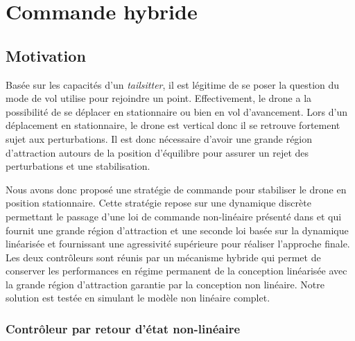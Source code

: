 
\chapter{Commande hybride}
\minitoc


\section{Motivation}
Basée sur les capacités d'un \textit{tailsitter}, il est légitime de se poser la question du mode de vol utilise pour rejoindre un point. Effectivement, le drone a la possibilité de se déplacer en stationnaire ou bien en vol d'avancement. Lors d'un déplacement en stationnaire, le drone est vertical donc il se retrouve fortement sujet aux perturbations. Il est donc nécessaire d'avoir une grande région d'attraction autours de la position d'équilibre pour assurer un rejet des perturbations et une stabilisation.

Nous avons donc proposé une stratégie de commande pour stabiliser le drone en position stationnaire. Cette stratégie repose sur une dynamique discrète permettant le passage d'une loi de commande non-linéaire présenté dans \cite{2020e-MicCenZacFra} et qui fournit une grande région d'attraction et une seconde loi basée sur la dynamique linéarisée et fournissant une agressivité supérieure pour réaliser l'approche finale. Les deux contrôleurs sont réunis par un mécanisme hybride qui permet de conserver les performances en régime permanent de la conception linéarisée avec la grande région d'attraction garantie par la conception non linéaire. Notre solution est testée en simulant le modèle non linéaire complet.



\subsection{Contrôleur par retour d'état non-linéaire}

